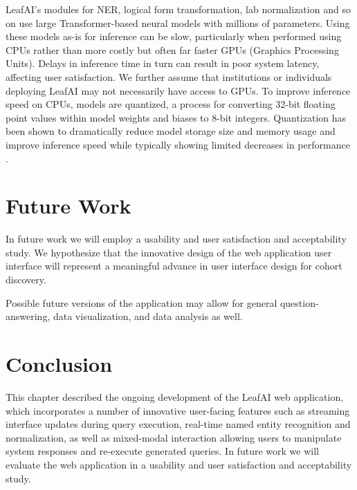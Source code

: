 \documentclass[../main.tex]{subfiles}
\begin{document}
LeafAI's modules for NER, logical form transformation, lab normalization and so on use large Transformer-based neural models \cite{vaswani2017attention} with millions of parameters. Using these models as-is for inference can be slow, particularly when performed using CPUs rather than more costly but often far faster GPUs (Graphics Processing Units). Delays in inference time in turn can result in poor system latency, affecting user satisfaction. We further assume that institutions or individuals deploying LeafAI may not necessarily have access to GPUs. To improve inference speed on CPUs, models are quantized, a process for converting 32-bit floating point values within model weights and biases to 8-bit integers. Quantization has been shown to dramatically reduce model storage size and memory usage and improve inference speed while typically showing limited decreases in performance \cite{hubara2017quantized}. 

\section{Future Work}

In future work we will employ a usability and user satisfaction and acceptability study. We hypothesize that the innovative design of the web application user interface will represent a meaningful advance in user interface design for cohort discovery.

Possible future versions of the application may allow for general question-answering, data visualization, and data analysis as well.

\section{Conclusion}

This chapter described the ongoing development of the LeafAI web application, which incorporates a number of innovative user-facing features such as streaming interface updates during query execution, real-time named entity recognition and normalization, as well as mixed-modal interaction allowing users to manipulate system responses and re-execute generated queries. In future work we will evaluate the web application in a usability and user satisfaction and acceptability study.
\end{document}
